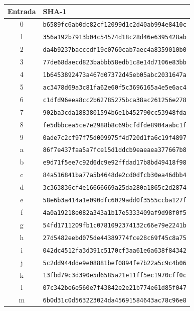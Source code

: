\documentclass[12pt,a4paper,twoside]{book}
\begin{document}
\begin{center}
\begin{footnotesize}
\begin{longtable}{|c|l|}
\hline
\textbf{Entrada} & \textbf{SHA-1} \\ \hline
0 & \texttt{b6589fc6ab0dc82cf12099d1c2d40ab994e8410c} \\ \hline
1 & \texttt{356a192b7913b04c54574d18c28d46e6395428ab} \\ \hline
2 & \texttt{da4b9237bacccdf19c0760cab7aec4a8359010b0} \\ \hline
3 & \texttt{77de68daecd823babbb58edb1c8e14d7106e83bb} \\ \hline
4 & \texttt{1b6453892473a467d07372d45eb05abc2031647a} \\ \hline
5 & \texttt{ac3478d69a3c81fa62e60f5c3696165a4e5e6ac4} \\ \hline
6 & \texttt{c1dfd96eea8cc2b62785275bca38ac261256e278} \\ \hline
7 & \texttt{902ba3cda1883801594b6e1b452790cc53948fda} \\ \hline
8 & \texttt{fe5dbbcea5ce7e2988b8c69bcfdfde8904aabc1f} \\ \hline
9 & \texttt{0ade7c2cf97f75d009975f4d720d1fa6c19f4897} \\ \hline
a & \texttt{86f7e437faa5a7fce15d1ddcb9eaeaea377667b8} \\ \hline
b & \texttt{e9d71f5ee7c92d6dc9e92ffdad17b8bd49418f98} \\ \hline
c & \texttt{84a516841ba77a5b4648de2cd0dfcb30ea46dbb4} \\ \hline
d & \texttt{3c363836cf4e16666669a25da280a1865c2d2874} \\ \hline
e & \texttt{58e6b3a414a1e090dfc6029add0f3555ccba127f} \\ \hline
f & \texttt{4a0a19218e082a343a1b17e5333409af9d98f0f5} \\ \hline
g & \texttt{54fd1711209fb1c0781092374132c66e79e2241b} \\ \hline
h & \texttt{27d5482eebd075de44389774fce28c69f45c8a75} \\ \hline
i & \texttt{042dc4512fa3d391c5170cf3aa61e6a638f84342} \\ \hline
j & \texttt{5c2dd944dde9e08881bef0894fe7b22a5c9c4b06} \\ \hline
k & \texttt{13fbd79c3d390e5d6585a21e11ff5ec1970cff0c} \\ \hline
l & \texttt{07c342be6e560e7f43842e2e21b774e61d85f047} \\ \hline
m & \texttt{6b0d31c0d563223024da45691584643ac78c96e8} \\ \hline

\end{longtable}
\end{footnotesize}
\end{center}
\end{document}
